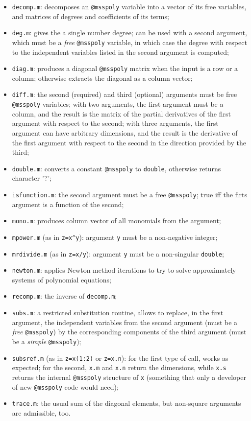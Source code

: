 \documentclass[12pt]{article}
\begin{document}
\begin{itemize}
\item {\tt decomp.m}: decomposes an {\tt @msspoly} variable into a vector of its
free variables, and matrices of degrees and coefficients of its terms;
\item {\tt deg.m}: gives the a single number degree; can be used with a second
argument, which must be a {\sl free} {\tt @msspoly} variable, in which case the
degree with respect to the independent variables listed in the second argument
is computed;
\item {\tt diag.m}: produces a diagonal {\tt @msspoly} matrix when the input is a row
or a column; otherwise extracts the diagonal as a column vector;
\item {\tt diff.m}: the second (required) and third (optional) arguments
must be free {\tt @msspoly}
variables; with two arguments, the first argument must be a column, and
the result is the matrix of the partial derivatives of the first
argument  with respect to the second; with three 
arguments, the first argument can have arbitrary dimensions,
and the result is the derivative of the first
argument  with respect to the second in the direction provided by the third;
\item {\tt double.m}: converts a constant {\tt @msspoly} to {\tt double},
otherwise returns character '?';
\item {\tt isfunction.m}: the second argument must be a free {\tt @msspoly};
true iff the firts argument is a function of the second;
\item {\tt mono.m}: produces column vector of all monomials from the argument;
\item {\tt mpower.m} (as in {\tt z=x\^{}y}): argument
{\tt y} must be a non-negative integer;
\item {\tt mrdivide.m} (as in {\tt z=x/y}): argument
{\tt y} must be a non-singular {\tt double};
\item {\tt newton.m}: applies Newton method iterations to try to solve
approximately systems of polynomial equations;
\item {\tt recomp.m}: the inverse of {\tt decomp.m};
\item {\tt subs.m}: a restricted substitution routine, allows to replace,
in the first argument,
the independent variables from the second argument 
(must be a {\sl free} {\tt @msspoly})
by the corresponding components of the third argument (must be a 
{\sl simple}  {\tt @msspoly});
\item {\tt subsref.m} (as in {\tt z=x(1:2)} or {\tt z=x.n}): for the first type
of call, works as expected; for the second, {\tt x.m} and {\tt x.n} return
the dimensions, while {\tt x.s} returns the internal {\tt @msspoly} structure 
of {\tt x} (something that only a developer of new {\tt @msspoly} code would need);
\item {\tt trace.m}: the usual sum of the diagonal elements,
but non-square arguments are admissible, too.
\end{itemize}
\end{document}
